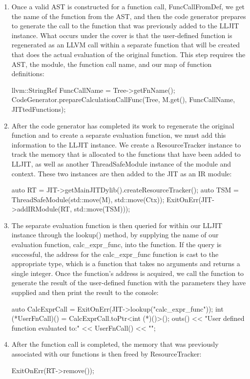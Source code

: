 \begin{enumerate}
\item
Once a valid AST is constructed for a function call, FuncCallFromDef, we get the name of the function from the AST, and then the code generator prepares to generate the call to the function that was previously added to the LLJIT instance. What occurs under the cover is that the user-defined function is regenerated as an LLVM call within a separate function that will be created that does the actual evaluation of the original function. This step requires the AST, the module, the function call name, and our map of function definitions:

\begin{cpp}
        llvm::StringRef FuncCallName = Tree->getFnName();
        CodeGenerator.prepareCalculationCallFunc(Tree, M.get(), FuncCallName, JITtedFunctions);
\end{cpp}

\item
After the code generator has completed its work to regenerate the original function and to create a separate evaluation function, we must add this information to the LLJIT instance. We create a ResourceTracker instance to track the memory that is allocated to the functions that have been added to LLJIT, as well as another ThreadSafeModule instance of the module and context. These two instances are then added to the JIT as an IR module:

\begin{cpp}
        auto RT = JIT->getMainJITDylib().createResourceTracker();
        auto TSM = ThreadSafeModule(std::move(M), std::move(Ctx));
        ExitOnErr(JIT->addIRModule(RT, std::move(TSM)));
\end{cpp}

\item
The separate evaluation function is then queried for within our LLJIT instance through the lookup() method, by supplying the name of our evaluation function, calc\_expr\_func, into the function. If the query is successful, the address for the calc\_expr\_func function is cast to the appropriate type, which is a function that takes no arguments and returns a single integer. Once the function’s address is acquired, we call the function to generate the result of the user-defined function with the parameters they have supplied and then print the result to the console:

\begin{cpp}
        auto CalcExprCall = ExitOnErr(JIT->lookup("calc_expr_func"));
        int (*UserFnCall)() = CalcExprCall.toPtr<int (*)()>();
        outs() << "User defined function evaluated to:" << UserFnCall() << "\n";
\end{cpp}

\item
After the function call is completed, the memory that was previously associated with our functions is then freed by ResourceTracker:

\begin{cpp}
ExitOnErr(RT->remove());
\end{cpp}
\end{enumerate}


